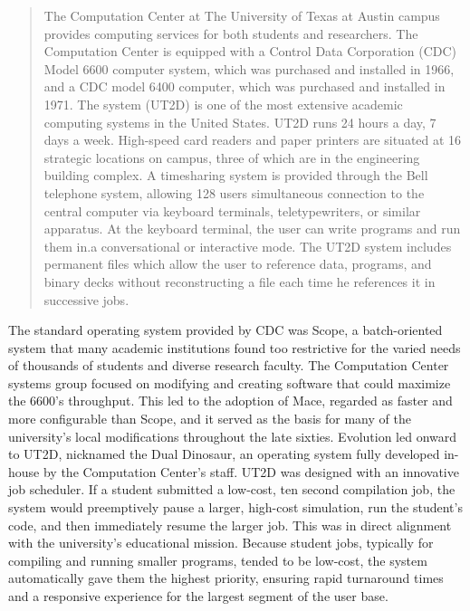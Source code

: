 \begin{quotation}
The Computation Center at The University of Texas at Austin campus provides computing services for both students and researchers. The Computation Center is equipped with a Control Data Corporation (CDC) Model 6600 computer system, which was purchased and installed in 1966, and a CDC model 6400 computer, which was purchased and installed in 1971. The system (UT2D) is one of the most extensive academic computing systems in the United States. UT2D runs 24 hours a day, 7 days a week. High-speed card readers and paper printers are situated at 16 strategic locations on campus, three of which are in the engineering building complex. A timesharing system is provided through the Bell telephone system, allowing 128 users simultaneous connection to the central computer via keyboard terminals, teletypewriters, or similar apparatus. At the keyboard terminal, the user can write programs and run them in.a conversational or interactive mode. The UT2D system includes permanent files which allow the user to reference data, programs, and binary decks without reconstructing a file each time he references it in successive jobs. \cite{derrSystem2000Data}
\end{quotation}

The standard operating system provided by CDC was Scope, a batch-oriented system that many academic institutions found too restrictive for the varied needs of thousands of students and diverse research faculty. The Computation Center systems group focused on modifying and creating software that could maximize the 6600’s throughput. This led to the adoption of Mace, regarded as faster and more configurable than Scope, and it served as the basis for many of the university's local modifications throughout the late sixties. Evolution led onward to UT2D, nicknamed the Dual Dinosaur, an operating system fully developed in-house by the Computation Center's staff. UT2D was designed with an innovative job scheduler. If a student submitted a low-cost, ten second compilation job, the system would preemptively pause a larger, high-cost simulation, run the student's code, and then immediately resume the larger job. This was in direct alignment with the university's educational mission. Because student jobs, typically for compiling and running smaller programs, tended to be low-cost, the system automatically gave them the highest priority, ensuring rapid turnaround times and a responsive experience for the largest segment of the user base. 

